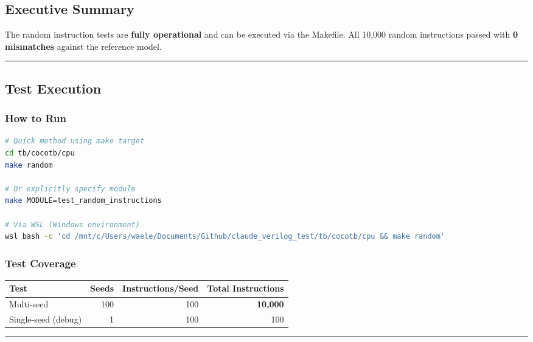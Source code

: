 \subsection{Executive Summary}\label{cr:status:random-tests-status:executive-summary}

\begin{record}

The random instruction tests are \textbf{fully operational} and can be
executed via the Makefile. All 10,000 random instructions passed with
\textbf{0 mismatches} against the reference model.

\begin{center}\rule{0.5\linewidth}{0.5pt}\end{center}

\end{record}

\subsection{Test Execution}\label{cr:status:random-tests-status:test-execution}

\subsubsection{How to Run}\label{cr:status:random-tests-status:how-to-run}

\begin{record}

\begin{lstlisting}[language=bash]
# Quick method using make target
cd tb/cocotb/cpu
make random

# Or explicitly specify module
make MODULE=test_random_instructions

# Via WSL (Windows environment)
wsl bash -c 'cd /mnt/c/Users/waele/Documents/Github/claude_verilog_test/tb/cocotb/cpu && make random'
\end{lstlisting}

\end{record}

\subsubsection{Test Coverage}\label{cr:status:random-tests-status:test-coverage}

\begin{record}

{
\begin{longtable}[]{@{}lrrr@{}}
\toprule\noalign{}
Test & Seeds & Instructions/\allowbreak{}Seed & Total Instructions \\
\midrule\noalign{}
\endhead
\bottomrule\noalign{}
\endlastfoot
Multi-seed & 100 & 100 & \textbf{10,000} \\
Single-seed (debug) & 1 & 100 & 100 \\
\end{longtable}
}

\begin{center}\rule{0.5\linewidth}{0.5pt}\end{center}

\end{record}

